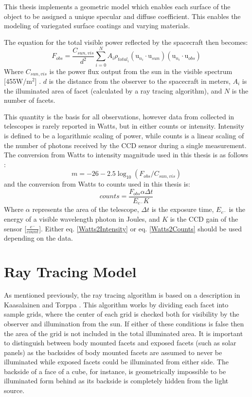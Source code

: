 This thesis implements a geometric model which enables each surface of the object to be assigned a unique specular and diffuse coefficient. This enables the modeling of variegated surface coatings and varying materials.

The equation for the total visible power reflected by the spacecraft then becomes:
\begin{equation}
F_{obs} = \frac{C_{sun,vis}}{{d^2}}\sum_{i=0}^N A_i\rho_{total_i}(\bm{\mathrm{u}}_{n_i}\cdotp \bm{\mathrm{u}}_{sun})(\bm{\mathrm{u}}_{n_i}\cdotp \bm{\mathrm{u}}_{obs})
\end{equation}
Where $C_{sun,vis}$ is the power flux output from the sun in the visible spectrum [455W/m$^2$] \cite{Linares_data_fusion}. $d$ is the distance from the observer to the spacecraft in meters, $A_i$ is the illuminated area of facet (calculated by a ray tracing algorithm), and $N$ is the number of facets.

This quantity is the basis for all observations, however data from collected in telescopes is rarely reported in Watts, but in either counts or intensity. Intensity is defined to be a logarithmic scaling of power, while counts is a linear scaling of the number of photons received by the CCD sensor during a single measurement. The conversion from Watts to intensity magnitude used in this thesis is as follows \cite{SpaceObjectCharacterization}:
\begin{equation} \label{Watts2Intensity}
m = -26 -2.5\log_{10}(F_{obs}/C_{sun,vis})
\end{equation}
and the conversion from Watts to counts used in this thesis is:
\begin{equation}\label{Watts2Counts}
counts = \frac{F_{obs}\alpha \Delta t}{E_{e^-} K}
\end{equation}
Where $\alpha$ represents the area of the telescope, $\Delta t$ is the exposure time, $E_{e^-}$ is the energy of a visible wavelength photon in Joules, and $K$ is the CCD gain of the sensor [$\frac{e^-}{count}$]. Either eq. \ref{Watts2Intensity} or eq. \ref{Watts2Counts} should be used depending on the data.

\section{Ray Tracing Model}

As mentioned previously, the ray tracing algorithm is based on a description in Kaasalainen and Torppa \cite{Kaasalainen_LCI}. This algorithm works by dividing each facet into sample grids, where the center of each grid is checked both for visibility by the observer and illumination from the sun. If either of these conditions is false then the area of the grid is not included in the total illuminated area. It is important to distinguish between body mounted facets and exposed facets (such as solar panels) as the backsides of body mounted facets are assumed to never be illuminated while exposed facets could be illuminated from either side. The backside of a face of a cube, for instance, is geometrically impossible to be illuminated form behind as its backside is completely hidden from the light source.

